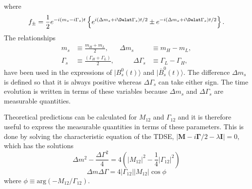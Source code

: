 {%
where 
\begin{equation}
f_{\pm} = \frac{1}{2} e^{-i(m_s - i\Gamma_s)t} \left \{ e^{i(\Delta m_s + i \Delat\Gamma_s)t/2} \pm e^{-i(\Delta m_s + i \Delat\Gamma_s)t/2} \right \}.
\end{equation}
The relationships
\begin{align}
m_s &\equiv \frac{m_H + m_L}{2}, &  \Delta m_s &\equiv m_H - m_L,\\
\Gamma_s &\equiv \frac{(\Gamma_H + \Gamma_L)}{2}, & \qquad \Delta \Gamma_s &\equiv \Gamma_L - \Gamma_H,
\label{eq:deltas}
\end{align}
have been used in the expressions of $|B^{0}_{s}(t)\rangle$ and $|\overline{B}^{0}_{s} (t) \rangle$. The difference $\Delta m_s$ is defined so that it is always positive whereas $\Delta\Gamma_s$ can take either sign. The time evolution is written in terms of these variables because $\Delta m_s$ and $\Delta\Gamma_s$ are measurable quantities.

Theoretical predictions can be calculated for $M_{12}$ and $\Gamma_{12}$ and it is therefore useful to express the measurable quantities in terms of these parameters. This is done by solving the characteristic equation of the TDSE, $|\mathbf{M} - i \mathbf{\Gamma}/2 - \lambda \mathbf{I}| = 0$, which has the solutions
\begin{equation}
\Delta m^2 - \frac{\Delta\Gamma^2}{4} = 4(|M_{12}|^2 - \frac{1}{4} |\Gamma_{12}|^2) 
\end{equation}
\begin{equation}
\Delta m \Delta \Gamma = 4 |\Gamma_{12}| |M_{12}| \cos \phi
\end{equation}
where $\phi \equiv \mathrm{arg}(-M_{12}/\Gamma_{12})$.

}
